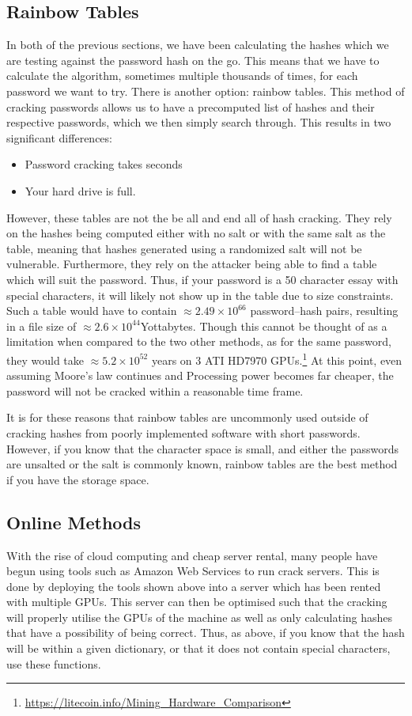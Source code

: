 \documentclass[a4paper,11pt]{report}
\begin{document}
		\subsection{Rainbow Tables}
			In both of the previous sections, we have been calculating the hashes which we are testing against the password hash on the go. 
			This means that we have to calculate the algorithm, sometimes multiple thousands of times, for each password we want to try. 
			There is another option: rainbow tables. 
			This method of cracking passwords allows us to have a precomputed list of hashes and their respective passwords, which we then simply search through. 
			This results in two significant differences:
			\begin{itemize}
				\item Password cracking takes seconds
				\item Your hard drive is full. 
			\end{itemize}
			However, these tables are not the be all and end all of hash cracking. 
			They rely on the hashes being computed either with no salt or with the same salt as the table, meaning that hashes generated using a randomized salt will not be vulnerable. 
			Furthermore, they rely on the attacker being able to find a table which will suit the password. 
			Thus, if your password is a 50 character essay with special characters, it will likely not show up in the table due to size constraints. 
			Such a table would have to contain $\approx2.49\times10^{66}$ password--hash pairs, resulting in a file size of $\approx2.6\times10^{44}$Yottabytes.
			Though this cannot be thought of as a limitation when compared to the two other methods, as for the same password, they would take $\approx5.2\times10^{52}$ years on 3 ATI HD7970 GPUs.\footnote{\url{https://litecoin.info/Mining\_Hardware\_Comparison}}
			At this point, even assuming Moore's law continues and Processing power becomes far cheaper, the password will not be cracked within a reasonable time frame. 

			It is for these reasons that rainbow tables are uncommonly used outside of cracking hashes from poorly implemented software with short passwords. 
			However, if you know that the character space is small, and either the passwords are unsalted or the salt is commonly known, rainbow tables are the best method if you have the storage space. 
		\subsection{Online Methods}
			With the rise of cloud computing and cheap server rental, many people have begun using tools such as Amazon Web Services to run crack servers. 
			This is done by deploying the tools shown above into a server which has been rented with multiple GPUs. 
			This server can then be optimised such that the cracking will properly utilise the GPUs of the machine as well as only calculating hashes that have a possibility of being correct. 
			Thus, as above, if you know that the hash will be within a given dictionary, or that it does not contain special characters, use these functions. 
\end{document}

